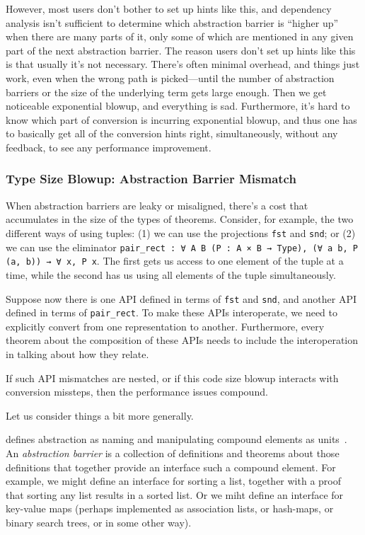 However, most users don't bother to set up hints like this, and dependency analysis isn't sufficient to determine which abstraction barrier is ``higher up'' when there are many parts of it, only some of which are mentioned in any given part of the next abstraction barrier.
The reason users don't set up hints like this is that usually it's not necessary.
There's often minimal overhead, and things just work, even when the wrong path is picked---until the number of abstraction barriers or the size of the underlying term gets large enough.
Then we get noticeable exponential blowup, and everything is sad.
Furthermore, it's hard to know which part of conversion is incurring exponential blowup, and thus one has to basically get all of the conversion hints right, simultaneously, without any feedback, to see any performance improvement.



\subsubsection{Type Size Blowup: Abstraction Barrier Mismatch} \label{sec:abstraction-barriers:mismatch}
When abstraction barriers are leaky or misaligned, there's a cost that accumulates in the size of the types of theorems.
Consider, for example, the two different ways of using tuples:
(1) we can use the projections \texttt{fst} and \texttt{snd}; or
(2) we can use the eliminator \texttt{pair_rect : ∀ A B (P : A × B → Type), (∀ a b, P (a, b)) → ∀ x, P x}.
The first gets us access to one element of the tuple at a time, while the second has us using all elements of the tuple simultaneously.

Suppose now there is one API defined in terms of \texttt{fst} and \texttt{snd}, and another API defined in terms of \texttt{pair_rect}.
To make these APIs interoperate, we need to explicitly convert from one representation to another.
Furthermore, every theorem about the composition of these APIs needs to include the interoperation in talking about how they relate.

If such API mismatches are nested, or if this code size blowup interacts with conversion missteps, then the performance issues compound.



Let us consider things a bit more generally.

 defines abstraction as naming and manipulating compound elements as units~\cite[p.~6]{Structure1996Sussman}.
An \emph{abstraction barrier} is a collection of definitions and theorems about those definitions that together provide an interface such a compound element.
For example, we might define an interface for sorting a list, together with a proof that sorting any list results in a sorted list.
Or we miht define an interface for key-value maps (perhaps implemented as association lists, or hash-maps, or binary search trees, or in some other way).

